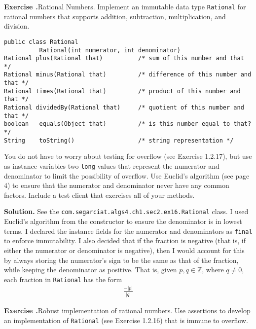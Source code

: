 \documentclass[12pt, a4paper]{article}
\newenvironment{ex}[2][Exercise]
{\par\medskip\noindent \textbf{#1 #2.}}
{\medskip}
\newenvironment{sol}[1][Solution]
{\par\medskip\noindent \textbf{#1.} }
{\medskip}
\begin{document}
	\begin{ex}{16}
		\emph{Rational Numbers}. Implement an immutable data type \texttt{Rational}
		for rational numbers that supports addition, subtraction, multiplication, and division.
		\begin{lstlisting}[language={}]
public class Rational
          Rational(int numerator, int denominator)
Rational plus(Rational that)          /* sum of this number and that */
Rational minus(Rational that)         /* difference of this number and that */
Rational times(Rational that)         /* product of this number and that */
Rational dividedBy(Rational that)     /* quotient of this number and that */
boolean   equals(Object that)         /* is this number equal to that? */
String    toString()                  /* string representation */
		\end{lstlisting}
		You do not have to worry about testing for overflow (see Exercise 1.2.17), but use
		as instance variables two \texttt{long} values that represent the numerator and
		denominator to limit the possibility of overflow. Use Euclid's algorithm (see page 4)
		to ensure that the numerator and denominator never have any common factors. Include
		a test client that exercises all of your methods.
	\end{ex}
	\begin{sol}
		See the \texttt{com.segarciat.algs4.ch1.sec2.ex16.Rational} class. I used Euclid's
		algorithm from the constructor to ensure the denominator is in lowest terms.
		I declared the instance  fields for the numerator and denominators as \texttt{final}
		to enforce immutability. I also decided that if the fraction is negative (that is,
		if either the numerator or denominator is negative), then I would account for this
		by always storing the numerator's sign to be the same as that of the fraction,
		while keeping the denominator as positive. That is, given $p,q\in \mathbb{Z}$,
		where $q\neq 0$, each fraction in \texttt{Rational} has the form
		\begin{align*}
			\frac{-|p|}{|q|}
		\end{align*}
	\end{sol}
	\begin{ex}{17}
		\emph{Robust implementation of rational numbers}. Use assertions to develop an implementation
		of \texttt{Rational} (see Exercise 1.2.16) that is immune to overflow.
	\end{ex}
\end{document}
